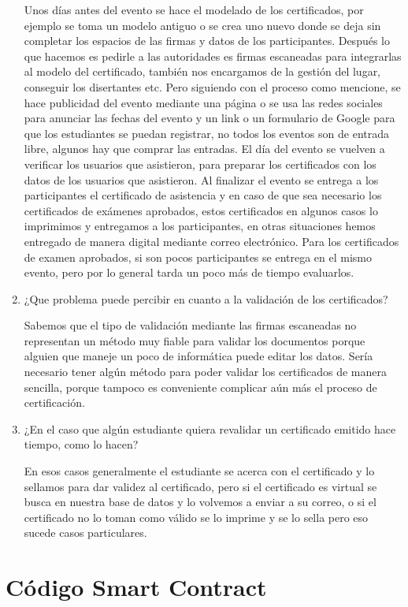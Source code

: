 \begin{enumerate}
    Unos días antes del evento se hace el modelado de los certificados, por ejemplo se toma
    un modelo antiguo o se crea uno nuevo donde se deja sin completar los espacios de las firmas y datos de los
    participantes. Después lo que hacemos es pedirle a las autoridades es firmas escaneadas para integrarlas al modelo 
    del certificado, también nos encargamos de la gestión del lugar, conseguir
    los disertantes etc. Pero siguiendo con el proceso como mencione, se hace publicidad del evento
    mediante una página o se usa las redes sociales para anunciar las fechas del evento y un link o un formulario de Google
    para que los estudiantes se puedan registrar, no todos los eventos son de entrada libre, algunos hay que 
    comprar las entradas.
    El día del evento se vuelven a verificar los usuarios que asistieron, para preparar 
    los certificados con los datos de los usuarios que asistieron.  
    Al finalizar el evento se entrega a los participantes el certificado de asistencia y en caso de que sea necesario
    los certificados de exámenes aprobados, estos certificados en algunos casos lo imprimimos y entregamos a 
    los participantes, en otras situaciones hemos entregado de manera digital mediante correo electrónico.
    Para los certificados de examen aprobados, si son pocos participantes se entrega en el mismo evento,
    pero por lo general tarda un poco más de tiempo evaluarlos. 



    \item ¿Que problema puede percibir en cuanto a la validación de los certificados?
    
   
    Sabemos que el tipo de validación mediante  las firmas escaneadas no representan un método muy
    fiable para validar los documentos porque alguien que maneje un poco de informática puede editar los datos.
    Sería necesario tener algún método  para poder validar los certificados de manera sencilla, porque tampoco es conveniente complicar
    aún más el proceso de certificación.

    \item ¿En el caso que algún estudiante quiera revalidar un certificado emitido hace tiempo, como lo hacen?
    
    En esos casos generalmente el estudiante se acerca con el certificado y lo sellamos para dar validez al certificado, pero si el certificado es virtual se busca en
    nuestra base de datos y lo volvemos a enviar a su correo, o si el certificado no lo toman como válido se lo imprime y se lo sella pero eso sucede
    casos particulares.





\end{enumerate}



\newpage
\section{Código Smart Contract} \label{as:codigo_smart_contract}


